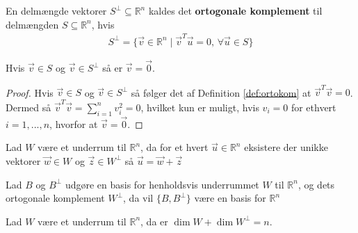 \begin{defn}
En delmængde vektorer $S^{\bot} \subseteq \mathds{R}^n$ kaldes det \textbf{ortogonale komplement} til delmængden $S \subseteq \mathds{R}^n$, hvis 
\begin{align*}
	S^{\bot} = \{\vec{v} \in \mathds{R}^n \mid \vec{v}^T\vec{u} = 0, \, \forall \vec{u} \in S\}
\end{align*}
\label{def:ortokom}
\end{defn}

\begin{prop}
Hvis $\vec{v} \in S$ og $\vec{v} \in S^{\bot}$ så er  $\vec{v}=\vec{0}$.
\end{prop}
\begin{proof}
Hvis $\vec{v} \in S$ og $\vec{v} \in S^{\bot}$ så følger det af Definition \ref{def:ortokom} at $\vec{v}^T\vec{v} = 0$.
Dermed så $\vec{v}^T\vec{v} = \sum_{i=1}^n v_i^2 =0$, hvilket kun er muligt, hvis $v_i = 0$ for ethvert $i = 1,..., n$, hvorfor at $\vec{v}=\vec{0}$.
\end{proof}


\begin{stn}
Lad $W$ være et underrum til $\mathds{R}^n$, da for et hvert $\vec{u} \in \mathds{R}^n$ eksistere der unikke vektorer $\vec{w} \in W$ og $\vec{z} \in W^{\bot}$ så $\vec{u}= \vec{w}+\vec{z}$
\end{stn}

\begin{kor}
Lad $B$  og $B^{\bot}$ udgøre en basis for henholdsvis underrummet $W$ til $\mathds{R}^n$, og dets ortogonale komplement $W^{\bot}$, da vil $\{B, B^{\bot}\}$ være en basis for $\mathds{R}^n$
\end{kor}

\begin{kor}
Lad $W$ være et underrum til $\mathds{R}^n$, da er $\dim {W} + \dim {W^{\bot}} = n$.
\end{kor}
 

 